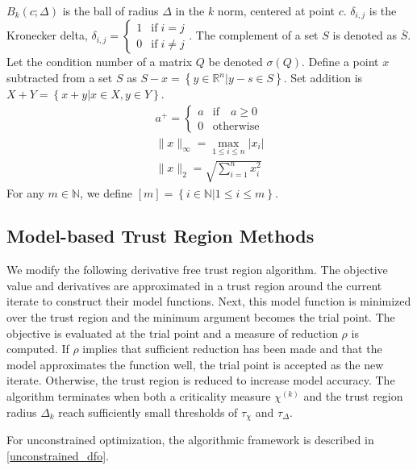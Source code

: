 \documentclass{article}
\theoremstyle{case}
\numberwithin{theorem}{subsection}
\newcommand{\chik}{{\chi^{(k)}}}
\newcommand{\naturals}{\mathbb N}
\newcommand{\Rn}{\mathbb R^n}
\begin{document}
$B_k(c; \Delta)$ is the ball of radius $\Delta$ in the $k$ norm, centered at point $c$.
$\delta_{i,j}$ is the Kronecker delta, $\delta_{i, j} = \begin{cases} 1 & \textrm{if} \; i = j \\ 0 & \textrm{if} \; i \ne j \end{cases}$.
The complement of a set $S$ is denoted as $\bar S$.
Let the condition number of a matrix $Q$ be denoted $\sigma(Q)$.
Define a point $x$ subtracted from a set $S$ as $S - x = \left\{y \in \Rn | y - s \in S\right\}$.
Set addition is $X + Y = \left\{x + y | x \in X, y \in Y\right\}$.
\begin{align*}
a^+ = \begin{cases} a & \textrm{if} \quad a \ge 0 \\ 0 & \textrm{otherwise} \end{cases}\\
\|x\|_{\infty} = \max_{1\le i\le n}|x_i| \\
\|x\|_{2} = \sqrt{\sum_{i=1}^n x_i^2}
\end{align*}
For any $m \in \naturals$, we define $[m] = \left\{i \in \naturals | 1 \le i \le m\right\}$.

\subsection{Model-based Trust Region Methods}

We modify the following derivative free trust region algorithm.
The objective value and derivatives are approximated in a trust region around the current iterate to construct their model functions.
Next, this model function is minimized over the trust region and the minimum argument becomes the trial point.
The objective is evaluated at the trial point and a measure of reduction $\rho$ is computed.
If $\rho$ implies that sufficient reduction has been made and that the model approximates the function well, the trial point is accepted as the new iterate.
Otherwise, the trust region is reduced to increase model accuracy.
The algorithm terminates when both a criticality measure $\chik$ and the trust region radius $\Delta_k$ reach sufficiently small thresholds of $\tau_{\chi}$ and $\tau_{\Delta}$.


For unconstrained optimization, the algorithmic framework is described in \cref{unconstrained_dfo}.
\end{document}

